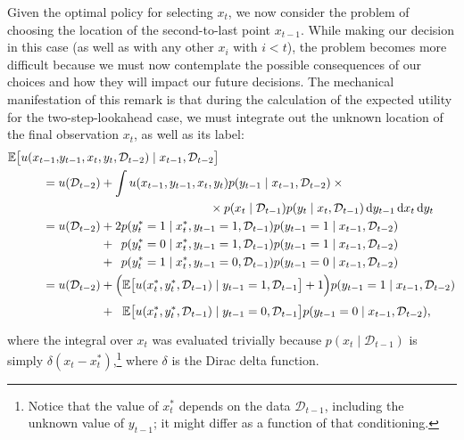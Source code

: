 \documentclass{article}
\newcommand{\cm}[1]{\mathcal{#1}}
\newcommand{\data}{\cm{D}}
\newcommand{\given}{\mid}
\newcommand{\intd}[1]{\,\mathrm{d}#1}
\begin{document}
Given the optimal policy for selecting $x_t$, we now consider the
problem of choosing the location of the second-to-last point
$x_{t-1}$.  While making our decision in this case (as well as with
any other $x_i$ with $i < t$), the problem becomes more difficult
because we must now contemplate the possible consequences of our
choices and how they will impact our future decisions. The mechanical
manifestation of this remark is that during the calculation of the
expected utility for the two-step-lookahead case, we must integrate
out the unknown location of the final observation $x_t$, as well as
its label:
\begin{align}\label{twostep}
  \mathbb{E}\bigl[
    u(x_{t-1}, &y_{t-1}, x_t, y_t, \data_{t-2}) 
    \given x_{t-1}, \data_{t-2}
  \bigr]
  {}
  \nonumber
  \\
  &
  \mspace{-25mu}
  =
  u(\data_{t-2}) 
  + 
  \int 
  u(x_{t-1}, y_{t-1}, x_t, y_t)
  p(y_{t-1} \given x_{t-1}, \data_{t-2})
  \times
  {}
  \nonumber
  \\
  &
  \mspace{225mu}
  {}
  \times
  p(x_t \given \data_{t-1})
  p(y_t \given x_t, \data_{t-1})
  \intd{y_{t-1}} 
  \intd{x_t} 
  \intd{y_t}
  \nonumber
  \\
  &
  \mspace{-25mu}
  =
  u(\data_{t-2})
  +
  2
  p(y_t^\ast = 1 \given x_t^\ast, y_{t-1} = 1, \data_{t-1})
  p(y_{t-1} = 1 \given x_{t-1}, \data_{t-2})
  \nonumber
  \\
  &
  {}
  \mspace{-25mu}
  \phantom{{} = u(\data_{t-2})}
  +
  \phantom{2}
  p(y_t^\ast = 0 \given x_t^\ast, y_{t-1} = 1, \data_{t-1})
  p(y_{t-1} = 1 \given x_{t-1}, \data_{t-2})
  \nonumber
  \\
  &
  {}
  \mspace{-25mu}
  \phantom{{} = u(\data_{t-2})}
  +
  \phantom{2}
  p(y_t^\ast = 1 \given x_t^\ast, y_{t-1} = 0, \data_{t-1})
  p(y_{t-1} = 0 \given x_{t-1}, \data_{t-2})
  \nonumber
  \\
  &
  \mspace{-25mu}
  =
  u(\data_{t-2})
  +
  \Bigl(
    \mathbb{E}
    \bigl[
      u(x_t^\ast, y_t^\ast, \data_{t-1}) \given y_{t-1} = 1, \data_{t-1}
    \bigr] 
    + 1
  \Bigr)
  p(y_{t-1} = 1 \given x_{t-1}, \data_{t-2})
  \nonumber
  \\
  &
  \mspace{62mu}
  +
  \phantom{\Bigl(}
  \mathbb{E}
  \bigl[
    u(x_t^\ast, y_t^\ast, \data_{t-1}) \given y_{t-1} = 0, \data_{t-1} 
  \bigr]
  p(y_{t-1} = 0 \given x_{t-1}, \data_{t-2}),
\end{align}
where the integral over $x_t$ was evaluated trivially because $p(x_t
\given \data_{t-1})$ is simply $\delta(x_t -
x_t^\ast)$,\footnote{Notice that the value of $x_t^\ast$ depends on
  the data $\data_{t-1}$, including the unknown value of $y_{t-1}$; it
  might differ as a function of that conditioning.} where $\delta$
is the Dirac delta function.
\end{document}
